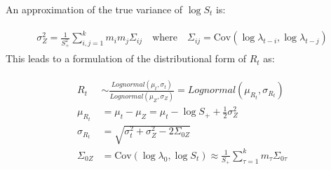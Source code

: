 \documentclass[a4paper, 12pt, twoside]{article}
\begin{document}
An approximation of the true variance of $ \log S_t $ is:

\begin{eqnarray}
\begin{aligned}
\sigma_Z^2 = \frac{1}{S_+^2} \sum_{i,j=1}^k m_i m_j \Sigma_{ij}
\quad \text{where} \quad
\Sigma_{ij} = \text{Cov}(\log \lambda_{t-i}, \log \lambda_{t-j})
\end{aligned}
\end{eqnarray}This leads to a formulation of the distributional form of $R_t$ as:

\begin{eqnarray}
\begin{aligned}
R_t &\sim \frac{Lognormal(\mu_t,\sigma_t)}
{Lognormal( \mu_{Z}, \sigma_{Z})} = Lognormal( \mu_{R_t}, \sigma_{R_t}) \\
\mu_{R_t} &= \mu_t - \mu_{Z} = \mu_t - \log S_+ + \frac{1}{2}\sigma_{Z}^2\\
\sigma_{R_t} &= \sqrt{\sigma_t^2+\sigma_{Z}^2 - 2 \Sigma_{0Z}} \\
\Sigma_{0Z} &= \text{Cov}(\log \lambda_0, \log S_t) \approx \frac{1}{S_+}\sum_{\tau=1}^k m_\tau \Sigma_{0\tau}\\
\end{aligned}
\end{eqnarray}

%
\end{document}
